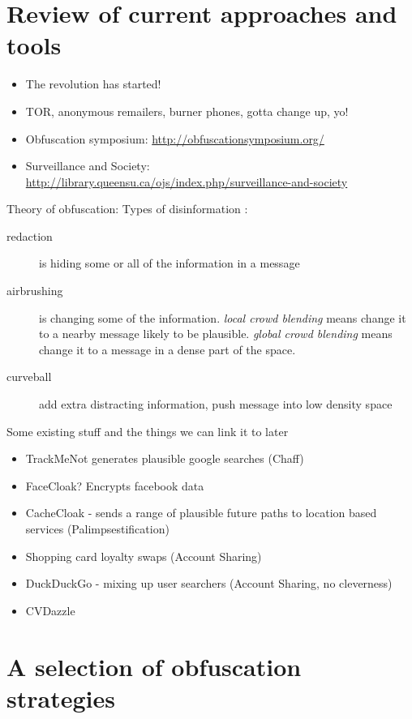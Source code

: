 \documentclass{IOS-Book-Article}     %
\newcommand{\tbox}[3][red]{{
\color{#1}\noindent{
   \fbox{\scriptsize{ {\bf #2} \textsl{#3}}}
   \vspace{2pt}
}
}}
\newcommand{\todo}[1]{\tbox{TODO:}{#1}}
\begin{document}
\section{Review of current approaches and tools} 
\todo{Max to do some writing}

\begin{itemize}
  \item The revolution has started!
  \item TOR, anonymous remailers, burner phones, gotta change up, yo!
  \item Obfuscation symposium: \url{http://obfuscationsymposium.org/}
  \item Surveillance and Society: \url{http://library.queensu.ca/ojs/index.php/surveillance-and-society}
\end{itemize}

Theory of obfuscation:
Types of disinformation \cite{alexander2010Disinformation}:
\begin{description}
  \item[redaction] is hiding some or all of the information in a message
  \item[airbrushing] is changing some of the information. \emph{local crowd
  blending} means change it to a nearby message likely to be plausible.
  \emph{global crowd blending} means change it to a message in a dense part of
  the space.
  \item[curveball] add extra distracting information, push message into low
  density space
\end{description}

Some existing stuff and the things we can link it to later

\begin{itemize}
  \item TrackMeNot generates plausible google searches (Chaff)
  \item FaceCloak? Encrypts facebook data
  \item CacheCloak - sends a range of plausible future paths to location based
  services (Palimpsestification)
  \item Shopping card loyalty swaps (Account Sharing)
  \item DuckDuckGo - mixing up user searchers (Account Sharing, no cleverness)
  \item CVDazzle
\end{itemize}





\section{A selection of obfuscation strategies}
\label{sec:strategies}
\end{document}
